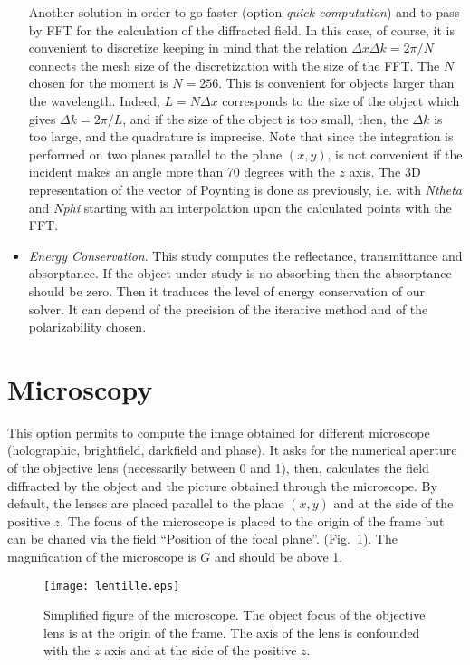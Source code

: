 \begin{itemize}
  Another solution in order to go faster (option {\it quick
    computation}) and to pass by FFT for the calculation of the
  diffracted field.  In this case, of course, it is convenient to
  discretize keeping in mind that the relation
  $\Delta x \Delta k=2\pi/N$ connects the mesh size of the
  discretization with the size of the FFT. The $N$ chosen for the
  moment is $N=256$. This is convenient for objects larger than the
  wavelength. Indeed, $L=N\Delta x$ corresponds to the size of the
  object which gives $\Delta k=2\pi/L$, and if the size of the object
  is too small, then, the $\Delta k$ is too large, and the quadrature
  is imprecise. Note that since the integration is performed on two
  planes parallel to the plane $(x,y)$, is not convenient if the
  incident makes an angle more than 70 degrees with the $z$ axis. The
  3D representation of the vector of Poynting is done as previously,
  i.e. with {\it Ntheta} and {\it Nphi} starting with an interpolation
  upon the calculated points with the FFT.

\item {\it Energy Conservation}. This study computes the reflectance,
  transmittance and absorptance. If the object under study is no
  absorbing then the absorptance should be zero. Then it traduces the
  level of energy conservation of our solver. It can depend of the
  precision of the iterative method and of the polarizability chosen.

\end{itemize}
  
\section{Microscopy}
  
This option permits to compute the image obtained for different
microscope (holographic, brightfield, darkfield and phase). It asks
for the numerical aperture of the objective lens (necessarily between
0 and 1), then, calculates the field diffracted by the object and the
picture obtained through the microscope. By default, the lenses are
placed parallel to the plane $(x,y)$ and at the side of the positive
$z$. The focus of the microscope is placed to the origin of the frame
but can be chaned via the field ``Position of the focal plane''.
(Fig.~\ref{lentille}). The magnification of the microscope is $G$ and
should be above 1.

\begin{figure}[h]
\begin{center}
\texttt{[image: lentille.eps]}
\caption{Simplified figure of the microscope. The object focus of the
  objective lens is at the origin of the frame. The axis of the lens
  is confounded with the $z$ axis and at the side of the positive
  $z$.}
\label{lentille}
\end{center}
\end{figure}


